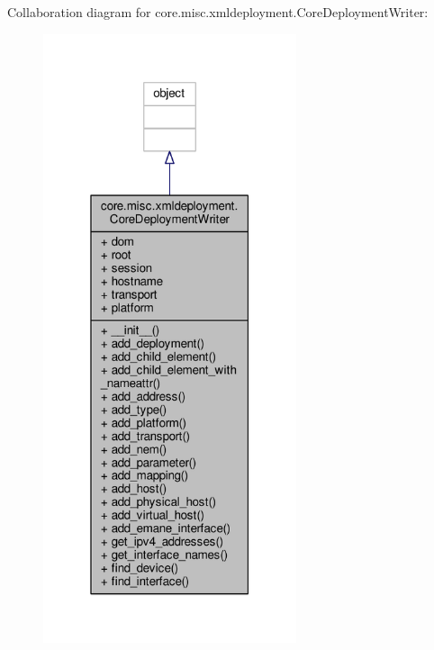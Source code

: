 Collaboration diagram for core.\+misc.\+xmldeployment.\+Core\+Deployment\+Writer\+:
\nopagebreak
\begin{figure}[H]
\begin{center}
\leavevmode
\includegraphics[width=211pt]{classcore_1_1misc_1_1xmldeployment_1_1_core_deployment_writer__coll__graph}
\end{center}
\end{figure}

